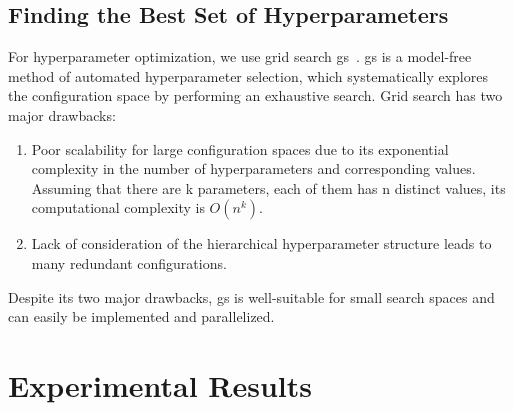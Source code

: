 \subsection{Finding the Best Set of Hyperparameters}
\label{sec:implement:setup: gridsearch}
For hyperparameter optimization, we use grid search \ac{gs}~\cite{Lorenzo2017,Yang2020,Zoeller2021}.
\Ac{gs} is a model-free method of automated hyperparameter selection, which systematically explores the configuration space by performing an exhaustive search.
Grid search has two major drawbacks:
\begin{enumerate}
    \item Poor scalability for large configuration spaces due to its exponential complexity in the number of hyperparameters and corresponding values.
          Assuming that there are k parameters, each of them has n distinct values, its computational complexity is $O(n^{k})$.
    \item Lack of consideration of the hierarchical hyperparameter structure leads to many redundant configurations.
\end{enumerate}
Despite its two major drawbacks, \ac{gs} is well-suitable for small search spaces and can easily be implemented and parallelized.

\section{Experimental Results}
\label{sec:eval:results}

